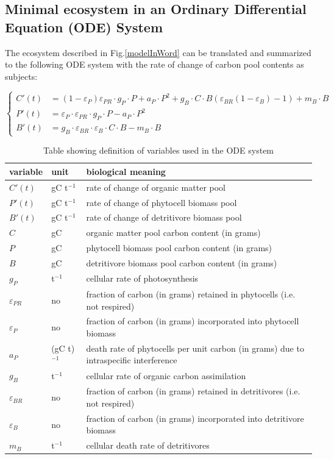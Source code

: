 \documentclass[../thesis.tex]{subfiles} %
\newcommand{\gP}{g_P}
\newcommand{\eP}{\varepsilon_P}
\newcommand{\aP}{a_P}
\newcommand{\ePR}{\varepsilon_{PR}}
\newcommand{\gB}{g_B}
\newcommand{\eB}{\varepsilon_B}
\newcommand{\mB}{m_B}
\newcommand{\eBR}{\varepsilon_{BR}}
\begin{document}
\subsection{Minimal ecosystem in an Ordinary Differential Equation (ODE) System}
The ecosystem described in Fig.\ref{modelInWord} can be translated and summarized to the following ODE system with the rate of change of carbon pool contents as subjects:

\begin{equation*}\left\{\begin{array}{rl}
    C'(t) &= (1-\eP)\ePR\cdot\gP\cdot P +\aP\cdot P^2 +\gB\cdot C\cdot B(\eBR(1-\eB)-1) +\mB\cdot B\\
    P'(t) &= \eP\cdot\ePR\cdot\gP\cdot P -\aP\cdot P^2\\
    B'(t) &= \gB\cdot\eBR\cdot\eB\cdot C\cdot B -\mB\cdot B
\end{array}\right.\end{equation*}

\begin{table}[H]
    \centering
    \caption[Algebra variables definitions]{Table showing definition of variables used in the ODE system}
    \begin{tabular}{p{.1\linewidth}p{.1\linewidth}p{.7\linewidth}}\hline
        variable & unit & biological meaning \\\hline
        $C'(t)$ & gC t$^{-1}$ & rate of change of organic matter pool\\
        $P'(t)$ & gC t$^{-1}$ & rate of change of phytocell biomass pool\\
        $B'(t)$ & gC t$^{-1}$ & rate of change of detritivore biomass pool\\
        $C$ & gC & organic matter pool carbon content (in grams)\\
        $P$ & gC & phytocell  biomass pool carbon content (in grams)\\
        $B$ & gC & detritivore biomass pool carbon content (in grams)\\
        $\gP$ & t$^{-1}$ & cellular rate of photosynthesis\\
        $\ePR$ & no & fraction of carbon (in grams) retained in phytocells (i.e. not respired)\\
        $\eP$ & no & fraction of carbon (in grams) incorporated into phytocell biomass\\
        $\aP$ & (gC t)$^{-1}$ & death rate of phytocells per unit carbon (in grams) due to intraspecific interference\\
        $\gB$ & t$^{-1}$ & cellular rate of organic carbon assimilation\\
        $\eBR$ & no & fraction of carbon (in grams) retained in detritivores (i.e. not respired)\\
        $\eB$ & no & fraction of carbon (in grams) incorporated into detritivore biomass\\
        $\mB$ & t$^{-1}$ & cellular death rate of detritivores\\\hline
    \end{tabular}
    \label{varInTab}
\end{table}
\end{document}
